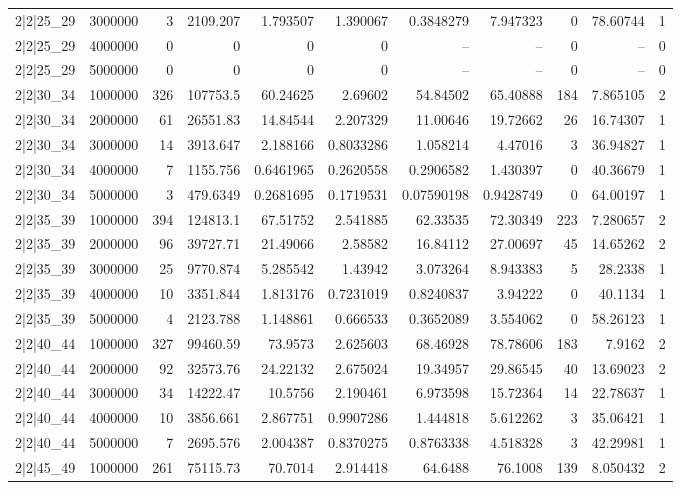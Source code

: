 \begin{tabular}{lrrrrrrrrrr}
2|2|25\_29 & 3000000 & 3 & 2109.207 & 1.793507 & 1.390067 & 0.3848279 & 7.947323 & 0 & 78.60744 & 1 \\
2|2|25\_29 & 4000000 & 0 & 0 & 0 & 0 & -- & -- & 0 & -- & 0 \\
2|2|25\_29 & 5000000 & 0 & 0 & 0 & 0 & -- & -- & 0 & -- & 0 \\
2|2|30\_34 & 1000000 & 326 & 107753.5 & 60.24625 & 2.69602 & 54.84502 & 65.40888 & 184 & 7.865105 & 2 \\
2|2|30\_34 & 2000000 & 61 & 26551.83 & 14.84544 & 2.207329 & 11.00646 & 19.72662 & 26 & 16.74307 & 1 \\
2|2|30\_34 & 3000000 & 14 & 3913.647 & 2.188166 & 0.8033286 & 1.058214 & 4.47016 & 3 & 36.94827 & 1 \\
2|2|30\_34 & 4000000 & 7 & 1155.756 & 0.6461965 & 0.2620558 & 0.2906582 & 1.430397 & 0 & 40.36679 & 1 \\
2|2|30\_34 & 5000000 & 3 & 479.6349 & 0.2681695 & 0.1719531 & 0.07590198 & 0.9428749 & 0 & 64.00197 & 1 \\
2|2|35\_39 & 1000000 & 394 & 124813.1 & 67.51752 & 2.541885 & 62.33535 & 72.30349 & 223 & 7.280657 & 2 \\
2|2|35\_39 & 2000000 & 96 & 39727.71 & 21.49066 & 2.58582 & 16.84112 & 27.00697 & 45 & 14.65262 & 2 \\
2|2|35\_39 & 3000000 & 25 & 9770.874 & 5.285542 & 1.43942 & 3.073264 & 8.943383 & 5 & 28.2338 & 1 \\
2|2|35\_39 & 4000000 & 10 & 3351.844 & 1.813176 & 0.7231019 & 0.8240837 & 3.94222 & 0 & 40.1134 & 1 \\
2|2|35\_39 & 5000000 & 4 & 2123.788 & 1.148861 & 0.666533 & 0.3652089 & 3.554062 & 0 & 58.26123 & 1 \\
2|2|40\_44 & 1000000 & 327 & 99460.59 & 73.9573 & 2.625603 & 68.46928 & 78.78606 & 183 & 7.9162 & 2 \\
2|2|40\_44 & 2000000 & 92 & 32573.76 & 24.22132 & 2.675024 & 19.34957 & 29.86545 & 40 & 13.69023 & 2 \\
2|2|40\_44 & 3000000 & 34 & 14222.47 & 10.5756 & 2.190461 & 6.973598 & 15.72364 & 14 & 22.78637 & 1 \\
2|2|40\_44 & 4000000 & 10 & 3856.661 & 2.867751 & 0.9907286 & 1.444818 & 5.612262 & 3 & 35.06421 & 1 \\
2|2|40\_44 & 5000000 & 7 & 2695.576 & 2.004387 & 0.8370275 & 0.8763338 & 4.518328 & 3 & 42.29981 & 1 \\
2|2|45\_49 & 1000000 & 261 & 75115.73 & 70.7014 & 2.914418 & 64.6488 & 76.1008 & 139 & 8.050432 & 2 \\

\end{tabular}
